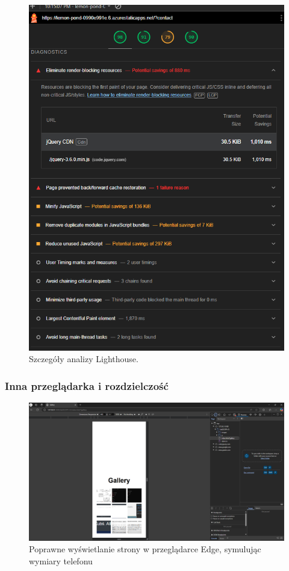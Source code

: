 \documentclass[a4paper,12pt]{article}
\begin{document}
\begin{figure}[H]
    \centering
    \includegraphics[width=1\textwidth]{images/lighthouse_details.png}
    \caption{Szczegóły analizy Lighthouse.}
\end{figure}

\subsubsection{Inna przeglądarka i rozdzielczość}

\begin{figure}[H]
    \centering
    \includegraphics[width=1\textwidth]{images/edge.png}
    \caption{Poprawne wyświetlanie strony w przeglądarce Edge, symulując wymiary telefonu}
\end{figure}
\end{document}
